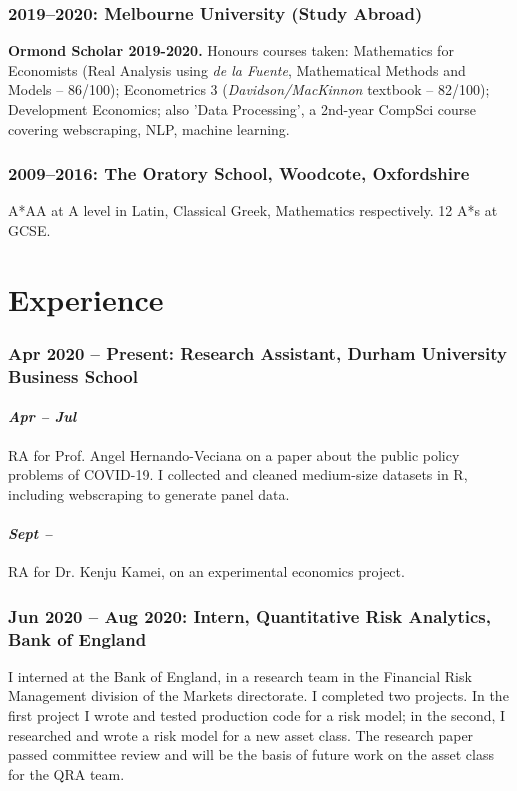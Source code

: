 \documentclass[a4]{article}
\begin{document}
\subsubsection*{2019--2020: Melbourne University (Study Abroad)}
\textbf{Ormond Scholar 2019-2020.} Honours courses taken: Mathematics for Economists (Real Analysis using \textit{de la Fuente}, Mathematical Methods and Models  -- 86/100); Econometrics 3 (\textit{Davidson/MacKinnon} textbook -- 82/100);  Development Economics; also 'Data Processing', a 2nd-year CompSci course covering webscraping, NLP, machine learning.

\subsubsection*{2009--2016: The Oratory School, Woodcote, Oxfordshire}
A*AA at A level in Latin, Classical Greek, Mathematics respectively. 12 A*s at GCSE.
  

\section*{Experience}
\subsubsection*{Apr 2020 -- Present: Research Assistant, Durham University Business School}
\paragraph*{\textit{Apr -- Jul}} RA for Prof. Angel Hernando-Veciana on a paper about the public policy problems of COVID-19. I collected and cleaned medium-size datasets in R, including webscraping to generate panel data.%
\paragraph{\textit{Sept --}} RA for Dr. Kenju Kamei, on an experimental economics project.

\subsubsection*{Jun 2020 -- Aug 2020: Intern, Quantitative Risk Analytics, Bank of England}
I interned at the Bank of England, in a research team in the Financial Risk Management division of the Markets directorate. I completed two projects. In the first project I wrote and tested production code for a risk model; in the second, I researched and wrote a risk model for a new asset class. The research paper passed committee review and will be the basis of future work on the asset class for the QRA team. 
\end{document}
